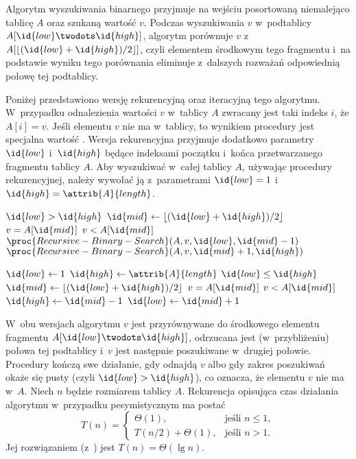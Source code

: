 \exercise %
Algorytm wyszukiwania binarnego przyjmuje na wejściu posortowaną niemalejąco tablicę $A$ oraz szukaną wartość $v$.
Podczas wyszukiwania $v$ w~podtablicy $A[\id{low}\twodots\id{high}]$, algorytm porównuje $v$ z~$A[\lfloor(\id{low}+\id{high})/2\rfloor]$, czyli elementem środkowym tego fragmentu i~na podstawie wyniku tego porównania eliminuje z~dalszych rozważań odpowiednią połowę tej podtablicy.

Poniżej przedstawiono wersję rekurencyjną oraz iteracyjną tego algorytmu.
W~przypadku odnalezienia wartości $v$ w~tablicy $A$ zwracany jest taki indeks $i$, że $A[i]=v$.
Jeśli elementu $v$ nie ma w~tablicy, to wynikiem procedury jest specjalna wartość .
Wersja rekurencyjna przyjmuje dodatkowo parametry $\id{low}$ i~$\id{high}$ będące indeksami początku i~końca przetwarzanego fragmentu tablicy $A$.
Aby wyszukiwać w~całej tablicy $A$, używając procedury rekurencyjnej, należy wywołać ją z~parametrami $\id{low}=1$ i~$\id{high}=\attrib{A}{length}$.

\begin{codebox}
\li	\If $\id{low}>\id{high}$
\li		\Then \Return {}
		\End
\li	$\id{mid}\gets\lfloor(\id{low}+\id{high})/2\rfloor$
\li	\If $v=A[\id{mid}]$
\li		\Then \Return {}
		\End
\li	\If $v<A[\id{mid}]$
\li		\Then \Return $\proc{Recursive-Binary-Search}(A,v,\id{low},\id{mid}-1)$
\li		\Else \Return $\proc{Recursive-Binary-Search}(A,v,\id{mid}+1,\id{high})$
		\End
\end{codebox}

\begin{codebox}
\li	$\id{low}\gets1$
\li	$\id{high}\gets\attrib{A}{length}$
\li	\While $\id{low}\le\id{high}$
\li		\Do $\id{mid}\gets\lfloor(\id{low}+\id{high})/2\rfloor$
\li			\If $v=A[\id{mid}]$
\li				\Then \Return {}
				\End
\li			\If $v<A[\id{mid}]$
\li				\Then $\id{high}\gets\id{mid}-1$
\li				\Else $\id{low}\gets\id{mid}+1$
				\End
		\End
\li	\Return {}
\end{codebox}

W~obu wersjach algorytmu  $v$ jest przyrównywane do środkowego elementu fragmentu $A[\id{low}\twodots\id{high}]$, odrzucana jest (w~przybliżeniu) połowa tej podtablicy i~$v$ jest następnie poszukiwane w~drugiej połowie.
Procedury kończą swe działanie, gdy odnajdą $v$ albo gdy zakres poszukiwań okaże się pusty (czyli $\id{low}>\id{high}$), co oznacza, że elementu $v$ nie ma w~$A$.
Niech $n$ będzie rozmiarem tablicy $A$.
Rekurencja opisująca czas działania algorytmu w~przypadku pesymistycznym ma postać
\[
	T(n) =
	\begin{cases}
		\Theta(1), & \text{jeśli $n\le1$}, \\
		T(n/2)+\Theta(1), & \text{jeśli $n>1$}.
	\end{cases}
\]
Jej rozwiązaniem (z~) jest $T(n)=\Theta(\lg n)$.

